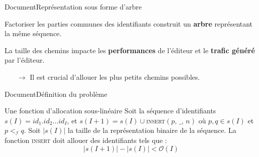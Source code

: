 \begin{frame}{Document}{Représentation sous forme d'arbre}

  \begin{center}
    
  \end{center}
  
  \vspace{0.15cm}
  
  \begin{minipage}{0.55\textwidth}
    Factoriser les parties communes des identifiants construit un \textbf{arbre}
    représentant la même séquence.

    \vspace{0.2cm}

    La taille des chemins impacte les \textbf{performances} de l'éditeur et le
    \textbf{trafic généré} par l'éditeur.
    \begin{itemize}
    \item [$\rightarrow$] Il est crucial d'allouer les plus petits chemins
      possibles.
    \end{itemize}
  \end{minipage}
  \hfill
  \begin{minipage}{0.37\textwidth}
    \begin{center}
      
    \end{center}
  \end{minipage}

\end{frame}



\begin{frame}{Document}{Définition du problème}

  \begin{block}{Une fonction d'allocation sous-linéaire}
    Soit la séquence d'identifiants $s(I)= id_1.id_2\ldots id_I$, et
    $s(I+1) = s(I) \cup $\textsc{insert}$(p,\, \_,\, n)$ où $p,q \in s(I)$ et
    $p<_\mathcal{I}q$. Soit $|s(I)|$ la taille de la représentation binaire de la
    séquence. La fonction \textsc{insert} doit allouer des identifiants tels que :
    \begin{equation}
      |s(I+1)| - |s(I)| < \mathcal{O}(I)
    \end{equation}
  \end{block}
  
\end{frame}


